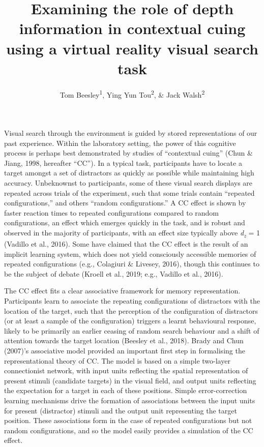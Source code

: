 \documentclass[
  english,
  man,floatsintext]{apa7}
\title{Examining the role of depth information in contextual cuing using a virtual reality visual search task}
\author{Tom Beesley\textsuperscript{1}, Ying Yun Tou\textsuperscript{2}, \& Jack Walsh\textsuperscript{2}}
\date{}
\affiliation{\vspace{0.5cm}\textsuperscript{1} Lancaster University, UK\\\textsuperscript{2} UNSW Sydney, Australia}
\begin{document}
\maketitle

Visual search through the environment is guided by stored representations of our past experience. Within the laboratory setting, the power of this cognitive process is perhaps best demonstrated by studies of ``contextual cuing'' (Chun \& Jiang, 1998, hereafter {``CC''}). In a typical task, participants have to locate a target amongst a set of distractors as quickly as possible while maintaining high accuracy. Unbeknownst to participants, some of these visual search displays are repeated across trials of the experiment, such that some trials contain ``repeated configurations,'' and others ``random configurations.'' A CC effect is shown by faster reaction times to repeated configurations compared to random configurations, an effect which emerges quickly in the task, and is robust and observed in the majority of participants, with an effect size typically above \emph{d\textsubscript{z}} = 1 (Vadillo et al., 2016). Some have claimed that the CC effect is the result of an implicit learning system, which does not yield consciously accessible memories of repeated configurations (e.g., Colagiuri \& Livesey, 2016), though this continues to be the subject of debate (Kroell et al., 2019; e.g., Vadillo et al., 2016).

The CC effect fits a clear associative framework for memory representation. Participants learn to associate the repeating configurations of distractors with the location of the target, such that the perception of the configuration of distractors (or at least a sample of the configuration) triggers a learnt behavioural response, likely to be primarily an earlier ceasing of random search behaviour and a shift of attention towards the target location (Beesley et al., 2018). Brady and Chun (2007)'s associative model provided an important first step in formalising the representational theory of CC. The model is based on a simple two-layer connectionist network, with input units reflecting the spatial representation of present stimuli (candidate targets) in the visual field, and output units reflecting the expectation for a target in each of these positions. Simple error-correction learning mechanisms drive the formation of associations between the input units for present (distractor) stimuli and the output unit representing the target position. These associations form in the case of repeated configurations but not random configurations, and so the model easily provides a simulation of the CC effect.
\end{document}
